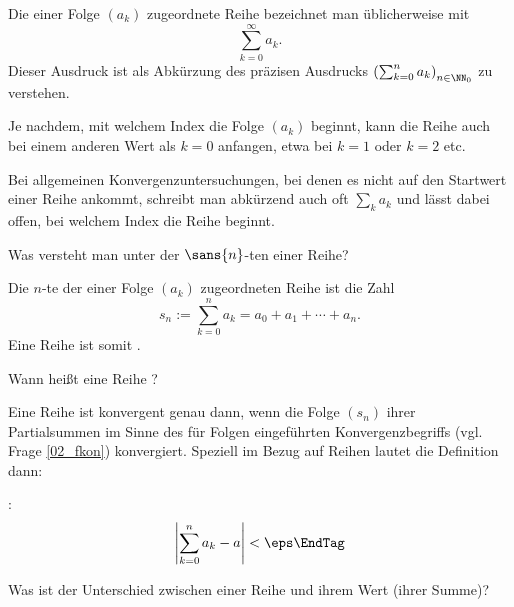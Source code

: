 \begin{antwort}
  Die einer Folge $(a_k)$ zugeordnete Reihe bezeichnet man 
  üblicherweise mit  
  \[
  \sum_{k=0}^\infty a_k.
  \]
  Dieser Ausdruck ist als Abkürzung des präzisen Ausdrucks 
  $\left( \sum_{k=0}^n a_k \right )_{n\in\NN_0}$ zu verstehen. 

  Je nachdem, mit welchem Index die Folge $(a_k)$ beginnt, kann die Reihe 
  auch bei einem anderen Wert als $k=0$ anfangen, 
  etwa bei $k=1$ oder $k=2$ etc. 
  
  Bei allgemeinen Konvergenzuntersuchungen, bei denen es nicht 
  auf den Startwert einer Reihe ankommt, schreibt man abkürzend 
  auch oft $\sum_k a_k$ und lässt 
  dabei offen, bei welchem Index die Reihe beginnt. 
  \AntEnd 
\end{antwort}

\begin{frage}\label{02_partial}
  Was versteht man unter der $\sans{n}$-ten  einer Reihe?
\end{frage}

\begin{antwort}
  Die $n$-te  der einer Folge $(a_k)$ zugeordneten 
  Reihe ist die Zahl
  \[
  s_n := \sum_{k=0}^n a_k = a_0+ a_1+ \cdots + a_n.
  \]
  Eine Reihe ist somit .
  \AntEnd
\end{antwort}

\begin{frage}\label{02_rkonv}
  Wann heißt eine Reihe ?
\end{frage}

\begin{antwort}
  Eine Reihe ist konvergent genau dann, wenn die Folge $(s_n)$ 
  ihrer Partialsummen im Sinne des für Folgen eingeführten 
  Konvergenzbegriffs (vgl. Frage \ref{02_fkon}) 
  konvergiert. Speziell im Bezug auf Reihen lautet die Definition dann:

  \medskip\noindent{}: 
  \[
  \left| \sum_{k=0}^n a_k -a \right| < \eps \EndTag
  \] 
\end{antwort}

\begin{frage}\label{02_rwert}
  Was ist der Unterschied zwischen einer Reihe und ihrem Wert (ihrer Summe)?
\end{frage}

